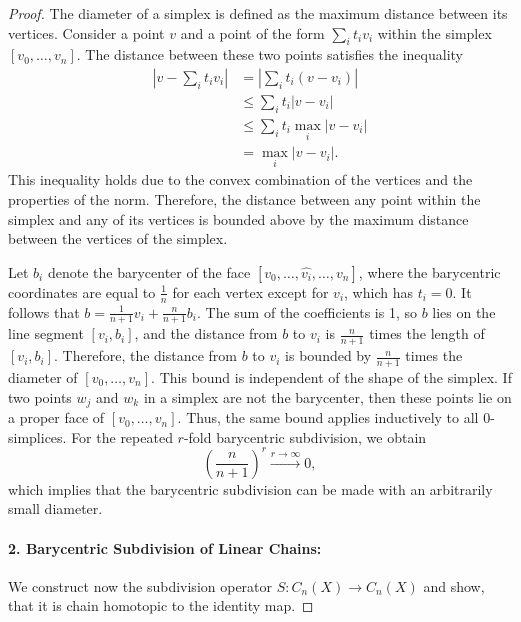 \begin{proof}
The diameter of a simplex is defined as the maximum distance between its vertices. Consider a point \(v\) and a point of the form \(\sum_i t_i v_i\) within the simplex \([v_0, \ldots, v_n]\). The distance between these two points satisfies the inequality
\begin{align*}
    \left\lvert v - \sum_i t_i v_i \right\rvert &= \left\lvert \sum_i t_i(v - v_i) \right\rvert \\
                              &\leq \sum_i t_i \left\lvert v - v_i \right\rvert \\
                              &\leq \sum_i t_i \max_i \left\lvert v - v_i \right\rvert \\
                              &= \max_i \left\lvert v - v_i \right\rvert.
\end{align*}
This inequality holds due to the convex combination of the vertices and the properties of the norm. Therefore, the distance between any point within the simplex and any of its vertices is bounded above by the maximum distance between the vertices of the simplex.

Let \(b_i\) denote the barycenter of the face \([v_0, \ldots, \hat{v_i}, \ldots, v_n]\), where the barycentric coordinates are equal to \(\frac{1}{n}\) for each vertex except for \(v_i\), which has \(t_i = 0\). It follows that \(b = \frac{1}{n+1} v_i + \frac{n}{n+1} b_i\). The sum of the coefficients is 1, so \(b\) lies on the line segment \([v_i, b_i]\), and the distance from \(b\) to \(v_i\) is \(\frac{n}{n+1}\) times the length of \([v_i, b_i]\). Therefore, the distance from \(b\) to \(v_i\) is bounded by \(\frac{n}{n+1}\) times the diameter of \([v_0, \ldots, v_n]\). This bound is independent of the shape of the simplex. If two points \(w_j\) and \(w_k\) in a simplex are not the barycenter, then these points lie on a proper face of \([v_0, \ldots, v_n]\). Thus, the same bound applies inductively to all \(0\)-simplices. For the repeated \(r\)-fold barycentric subdivision, we obtain
\[
\left(\frac{n}{n+1}\right)^r \xrightarrow[]{r \rightarrow \infty} 0,
\]
which implies that the barycentric subdivision can be made with an arbitrarily small diameter.

\paragraph{2. Barycentric Subdivision of Linear Chains:} We construct now the subdivision operator $S: C_n(X) \rightarrow C_n(X)$ and show, that it is chain homotopic to the identity map.


\end{proof}
